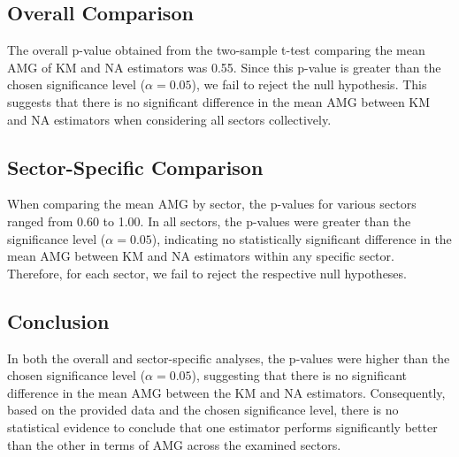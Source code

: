 \subsection{Overall Comparison}
The overall p-value obtained from the two-sample t-test comparing the mean AMG of KM and NA estimators was 0.55. Since this p-value is greater than the chosen significance level ($\alpha = 0.05$), we fail to reject the null hypothesis. This suggests that there is no significant difference in the mean AMG between KM and NA estimators when considering all sectors collectively.

\subsection{Sector-Specific Comparison}
When comparing the mean AMG by sector, the p-values for various sectors ranged from 0.60 to 1.00. In all sectors, the p-values were greater than the significance level ($\alpha = 0.05$), indicating no statistically significant difference in the mean AMG between KM and NA estimators within any specific sector. Therefore, for each sector, we fail to reject the respective null hypotheses.

\subsection{Conclusion}
In both the overall and sector-specific analyses, the p-values were higher than the chosen significance level ($\alpha = 0.05$), suggesting that there is no significant difference in the mean AMG between the KM and NA estimators. Consequently, based on the provided data and the chosen significance level, there is no statistical evidence to conclude that one estimator performs significantly better than the other in terms of AMG across the examined sectors.

